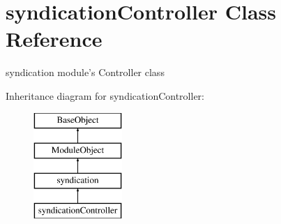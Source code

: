 \hypertarget{classsyndicationController}{\section{syndication\-Controller Class Reference}
\label{classsyndicationController}
}


syndication module's Controller class  


Inheritance diagram for syndication\-Controller\-:\begin{figure}[H]
\begin{center}
\leavevmode
\includegraphics[height=4.000000cm]{classsyndicationController}
\end{center}
\end{figure}
